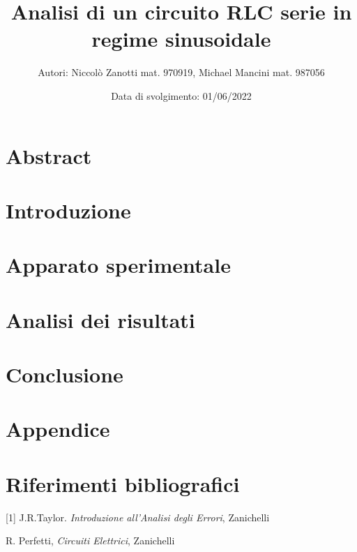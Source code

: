 \documentclass[11pt]{article}
\title{Analisi di un circuito RLC serie in regime sinusoidale}
\author{Autori: Niccolò Zanotti mat. 970919, Michael Mancini mat. 987056}
\date{Data di svolgimento: 01/06/2022}
\begin{document}
  \maketitle

  \section{Abstract}
    
 \section{Introduzione}
   
 \section{Apparato sperimentale}
   
 \section{Analisi dei risultati}
   
 \section{Conclusione}
  
 \section*{Appendice}
   
  \section*{Riferimenti bibliografici}
%  
  [1] J.R.Taylor. \emph{Introduzione all’Analisi degli Errori}, Zanichelli

  \noindent [2] R. Perfetti, \emph{Circuiti Elettrici}, Zanichelli



 
\end{document}
